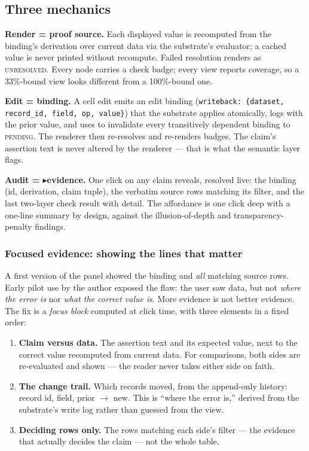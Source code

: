 \documentclass[11pt]{article}
\newcommand{\ev}{\ensuremath{\blacktriangleright}}
\begin{document}
\subsection{Three mechanics}\label{sec:mechanics}

\textbf{Render = proof source.} Each displayed value is recomputed from the binding's
derivation over current data via the substrate's evaluator; a cached value is never
printed without recompute. Failed resolution renders as \textsc{unresolved}. Every node
carries a check badge; every view reports coverage, so a 33\%-bound view looks
different from a 100\%-bound one.

\textbf{Edit = binding.} A cell edit emits an edit binding
(\texttt{writeback: \{dataset, record\_id, field, op, value\}}) that the substrate applies
atomically, logs with the prior value, and uses to invalidate every transitively
dependent binding to \textsc{pending}. The renderer then re-resolves and re-renders
badges. The claim's assertion text is never altered by the renderer --- that is what the
semantic layer flags.

\textbf{Audit = \ev evidence.} One click on any claim reveals, resolved live: the binding
(id, derivation, claim tuple), the verbatim source rows matching its filter, and the last
two-layer check result with detail. The affordance is one click deep with a one-line
summary by design, against the illusion-of-depth \cite{illusion} and transparency-penalty
\cite{provdensity} findings.

\subsubsection{Focused evidence: showing the lines that matter}\label{sec:focus}

A first version of the panel showed the binding and \emph{all} matching source rows. Early
pilot use by the author exposed the flaw: the user saw data,
but not \emph{where the error is} nor \emph{what the correct value is}. More evidence is
not better evidence. The fix is a \emph{focus block} computed at click time, with three
elements in a fixed order:

\begin{enumerate}
  \item \textbf{Claim versus data.} The assertion text and its expected value, next to the
        correct value recomputed from current data. For comparisons, both sides are
        re-evaluated and shown --- the reader never takes either side on faith.
  \item \textbf{The change trail.} Which records moved, from the append-only history:
        record id, field, prior $\to$ new. This is ``where the error is,'' derived from
        the substrate's write log rather than guessed from the view.
  \item \textbf{Deciding rows only.} The rows matching each side's filter --- the evidence
        that actually decides the claim --- not the whole table.
\end{enumerate}
\end{document}
